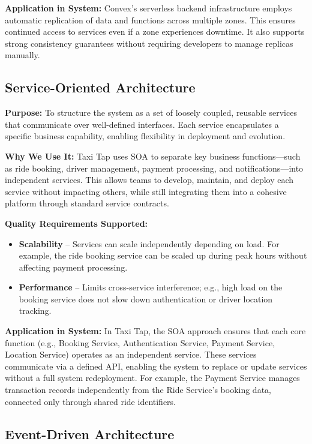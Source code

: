 \documentclass[12pt]{article}
\begin{document}
\textbf{Application in System:}  
Convex’s serverless backend infrastructure employs automatic replication of data and functions across multiple zones. This ensures continued access to services even if a zone experiences downtime. It also supports strong consistency guarantees without requiring developers to manage replicas manually.

\subsection{Service-Oriented Architecture}

\textbf{Purpose:}  
To structure the system as a set of loosely coupled, reusable services that communicate over well-defined interfaces. Each service encapsulates a specific business capability, enabling flexibility in deployment and evolution.

\textbf{Why We Use It:}  
Taxi Tap uses SOA to separate key business functions—such as ride booking, driver management, payment processing, and notifications—into independent services. This allows teams to develop, maintain, and deploy each service without impacting others, while still integrating them into a cohesive platform through standard service contracts.

\textbf{Quality Requirements Supported:}  
\begin{itemize}
  \item \textbf{Scalability} – Services can scale independently depending on load. For example, the ride booking service can be scaled up during peak hours without affecting payment processing.
  \item \textbf{Performance} – Limits cross-service interference; e.g., high load on the booking service does not slow down authentication or driver location tracking.
\end{itemize}

\textbf{Application in System:}  
In Taxi Tap, the SOA approach ensures that each core function (e.g., Booking Service, Authentication Service, Payment Service, Location Service) operates as an independent service. These services communicate via a defined API, enabling the system to replace or update services without a full system redeployment. For example, the Payment Service manages transaction records independently from the Ride Service's booking data, connected only through shared ride identifiers.

\subsection{Event-Driven Architecture}
\end{document}
